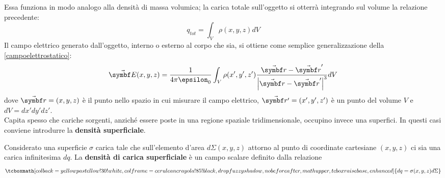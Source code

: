 Essa funziona in modo analogo alla densità di massa volumica; la carica totale sull'oggetto si otterrà integrando sul volume la relazione precedente:
\begin{equation}
	q_{tot}=\int_V\rho(x,y,z)dV
\end{equation}
Il campo elettrico generato dall'oggetto, interno o esterno al corpo che sia, si ottiene come semplice generalizzazione della \eqref{campoelettrostatico}:
\begin{equation}
	\vba{E}(x,y,z)=\frac{1}{4\pi\epsilon_0}\int_V\rho(x',y',z')\frac{\vba{r}-\vba{r}'}{\abs{\vba{r}-\vba{r}'}^3}dV\label{campoelettrostaticovol}
\end{equation}
dove $\vba{r}=(x,y,z)$ è il punto nello spazio in cui misurare il campo elettrico, $\vba{r'}=(x',y',z')$ è un punto del volume $V$ e $dV=dx'dy'dz'$.\\
Capita spesso che cariche sorgenti, anziché essere poste in una regione spaziale tridimensionale, occupino invece una superfici. In questi casi conviene introdurre la \textbf{densità superficiale}.
 \begin{define}
 	Considerato una superficie $\sigma$ carica tale che sull'elemento d'area $d\Sigma(x,y,z)$ attorno al punto di coordinate cartesiane $(x,y,z)$ ci sia una carica infinitesima $dq$. La \textbf{densità di carica superficiale} è un campo scalare definito dalla relazione
 	\begin{equation}
 		\tcboxmath[colback=yellowpastellow!30!white,colframe=ceruleancrayola!85!black,drop fuzzy shadow, nobeforeafter, math upper, tcbox raise base, enhanced]{dq=\sigma(x,y,z)d\Sigma}
 	\end{equation}
 \end{define}

